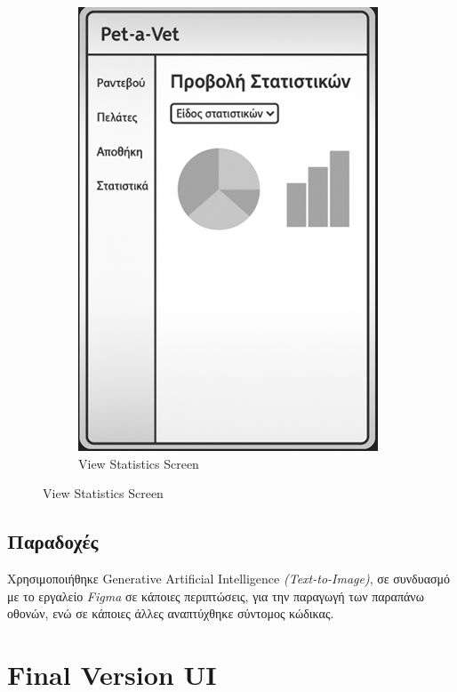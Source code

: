 \documentclass[12pt,a4paper,twoside]{book}
\begin{document}
\begin{figure}[H]
\begin{subfigure}[b]{0.48\textwidth}
        \includegraphics[width=\textwidth]{Resources/Mockup Screens/View_statistics.png}
        \caption{View Statistics Screen}\label{fig:mockup12}
    \end{subfigure}
\end{figure}

\subsection{Παραδοχές} %

Χρησιμοποιήθηκε Generative Artificial Intelligence \textit{(Text-to-Image)}, σε συνδυασμό με το εργαλείο \textit{Figma} σε κάποιες περιπτώσεις, για την παραγωγή των παραπάνω οθονών, ενώ σε κάποιες άλλες αναπτύχθηκε σύντομος κώδικας. %

\section{Final Version UI}
\end{document}
